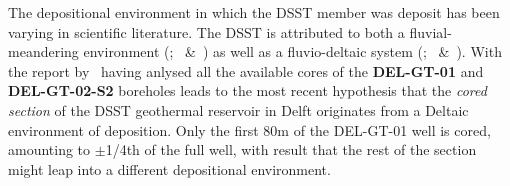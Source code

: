 The depositional environment in which the DSST member was deposit has been varying in scientific literature. The DSST is attributed to both a fluvial-meandering environment (\cite{donselaar2015reservoir};~\cite{vondrak2018reservoir} \&~\cite{willems2020geology}) as well as a fluvio-deltaic system (\cite{van1993stratigraphic};~\cite{weert2024multiple} \&~\cite{bruining2023sedimentological}). With the report by~\cite{bruining2023sedimentological} having anlysed all the available cores of the \textbf{DEL-GT-01} and \textbf{DEL-GT-02-S2} boreholes leads to the most recent hypothesis that the \textit{cored section} of the DSST geothermal reservoir in Delft originates from a Deltaic environment of deposition. Only the first 80m of the DEL-GT-01 well is cored, amounting to $\pm$1/4th of the full well, with result that the rest of the section might leap into a different depositional environment.\\

